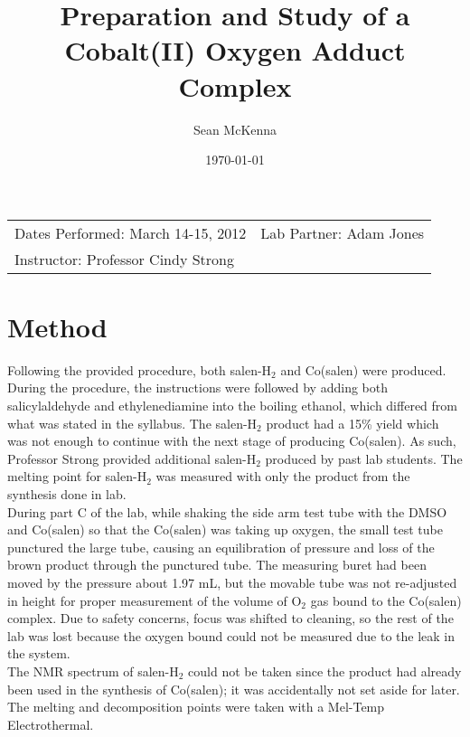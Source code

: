\documentclass[11pt]{article}
\title{Preparation and Study of a \\
Cobalt(II) Oxygen Adduct Complex}
\author{Sean McKenna}
\date{\today}
\newcommand{\sub}[1]{\ensuremath{_{\textrm{#1}}}}
\begin{document}
\maketitle

\begin{center}
\begin{tabular}{lr}
Dates Performed: March 14-15, 2012 & Lab Partner: Adam Jones\\
Instructor: Professor Cindy Strong
\end{tabular}
\end{center}


\section{Method}
Following the provided procedure,\cite{lab} both salen-H\sub{2} and Co(salen) were produced. \\

During the procedure, the instructions were followed by adding both salicylaldehyde and ethylenediamine into the boiling ethanol, which differed from what was stated in the syllabus. The salen-H\sub{2} product had a 15\% yield which was not enough to continue with the next stage of producing Co(salen). As such, Professor Strong provided additional salen-H\sub{2} produced by past lab students. The melting point for salen-H\sub{2} was measured with only the product from the synthesis done in lab. \\

During part C of the lab, while shaking the side arm test tube with the DMSO and Co(salen) so that the Co(salen) was taking up oxygen, the small test tube punctured the large tube, causing an equilibration of pressure and loss of the brown product through the punctured tube. The measuring buret had been moved by the pressure about 1.97 mL, but the movable tube was not re-adjusted in height for proper measurement of the volume of O\sub{2} gas bound to the Co(salen) complex. Due to safety concerns, focus was shifted to cleaning, so the rest of the lab was lost because the oxygen bound could not be measured due to the leak in the system. \\

The NMR spectrum of salen-H\sub{2} could not be taken since the product had already been used in the synthesis of Co(salen); it was accidentally not set aside for later. \\

The melting and decomposition points were taken with a Mel-Temp Electrothermal.
\end{document}
